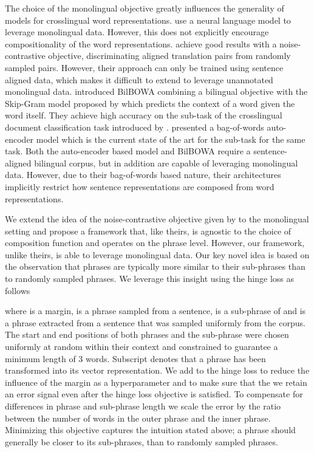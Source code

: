 \documentclass{article} \usepackage{iclr2015,times}
\begin{document}
The choice of the monolingual objective greatly influences the
generality of models for crosslingual word representations.
\citet{klementiev2012inducing} use a neural language model to
leverage monolingual data.
However, this does not explicitly encourage compositionality of the 
word representations.
\citet{hermann2014multilingual} achieve good results with a noise-contrastive
objective, discriminating aligned translation pairs from randomly sampled pairs.
However, their approach can only be trained using sentence aligned data,
which makes it difficult to extend to leverage unannotated monolingual data.
\citet{gouws2014bilbowa} introduced BilBOWA combining a bilingual
objective with the Skip-Gram model proposed by \citet{mikolov2013efficient}
which predicts the context of a word given the word itself.
They achieve high accuracy on the  sub-task of
the crosslingual document classification task introduced by
\citet{klementiev2012inducing}.
\citet{chandar2014autoencoder} presented a
bag-of-words auto-encoder model which is the current state of the art
for the 
sub-task for the same task.
Both the auto-encoder based model and BilBOWA require a sentence-aligned
bilingual corpus, but in addition are capable of leveraging
monolingual data.
However, due to their bag-of-words based nature, their architectures implicitly
restrict how sentence representations are composed from word representations.

We extend the idea of the noise-contrastive objective given by
\citet{hermann2014multilingual} to the monolingual setting
and propose a framework that, like theirs, is agnostic to the choice of
composition function and operates on the phrase level.
However, our framework, unlike theirs, is able to leverage monolingual data.
Our key novel idea is based on the observation that phrases are typically more
similar to their sub-phrases than to randomly sampled phrases.
We leverage this insight using the hinge loss as follows

where  is a margin,  is a phrase sampled from a sentence,
 is a sub-phrase of  and  is
a phrase extracted from a sentence that was sampled uniformly from
the corpus. 
The start and end positions of both phrases and 
the sub-phrase were chosen uniformly at random within their context and 
constrained to guarantee a minimum length of 3 words.
Subscript  denotes that a phrase has been transformed
into its vector representation.
We add  to the hinge loss to reduce the
influence of the margin as a hyperparameter and to make sure that the
we retain an error signal even after the hinge loss objective is satisfied.
To compensate for differences in phrase and sub-phrase length we scale the
error by the ratio between the number of words in the outer phrase and the
inner phrase.
Minimizing this objective captures the intuition stated above; a phrase
should generally be closer to its sub-phrases,
than to randomly sampled phrases.
\end{document}
